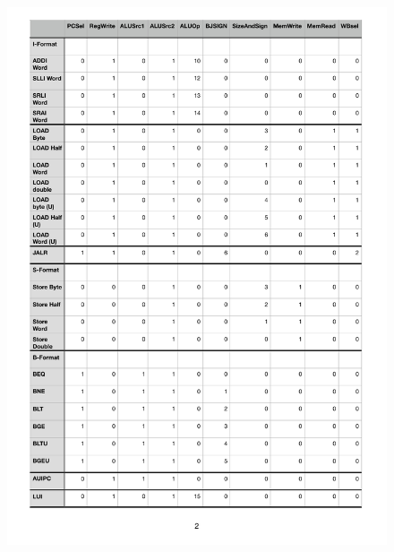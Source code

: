    \begin{figure}[h!]
        \vspace{-3cm}
        
        \hspace*{-2cm}
        \includegraphics[scale=1]{pictures/Controltable2.pdf}
    \end{figure} 


